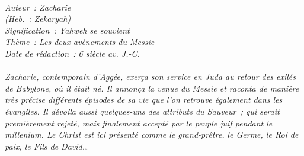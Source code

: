 \BFont
\noindent\hrulefill
{\footnotesize
\textit{
\bigskip
{\centering{}
\\Auteur~: Zacharie
\\(Heb.~: Zekaryah)
\\Signification~: Yahweh se souvient
\\Thème~: Les deux avènements du Messie
\\Date de rédaction~: 6 siècle av. J.-C.\\}
}
\textit{
\\Zacharie, contemporain d'Aggée, exerça son service en Juda au retour des exilés de Babylone, où il était né. Il annonça la venue du Messie et raconta de manière très précise différents épisodes de sa vie que l'on retrouve également dans les évangiles. Il dévoila aussi quelques-uns des attributs du Sauveur~; qui serait premièrement rejeté, mais finalement accepté par le peuple juif pendant le millenium. Le Christ est ici présenté comme le grand-prêtre, le Germe, le Roi de paix, le Fils de David…\bigskip
}
}
\par\nobreak\noindent\hrulefill
